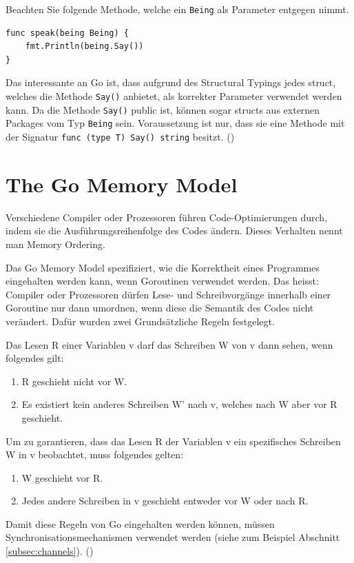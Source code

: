 \documentclass[11pt]{article}
\begin{document}
Beachten Sie folgende Methode, welche ein \lstinline{Being} als Parameter entgegen nimmt.
\begin{lstlisting}[caption=Verwenden eines Interfaces als Parameter]
func speak(being Being) {
	fmt.Println(being.Say())
}
\end{lstlisting}
Das interessante an Go ist, dass aufgrund des Structural Typings jedes struct, welches die Methode \lstinline{Say()} anbietet, als korrekter Parameter verwendet werden kann. Da die Methode \lstinline{Say()} public ist, können sogar structs aus externen Packages vom Typ \lstinline{Being} sein. Voraussetzung ist nur, dass sie eine Methode mit der Signatur \lstinline{func (type T) Say() string} besitzt. (\cite{Ducktypi27:online})


\section{The Go Memory Model}
Verschiedene Compiler oder Prozessoren führen Code-Optimierungen durch, indem sie die Ausführungsreihenfolge des Codes ändern. Dieses Verhalten nennt man Memory Ordering.

Das Go Memory Model spezifiziert, wie die Korrektheit eines Programmes eingehalten werden kann, wenn Goroutinen verwendet werden. Das heisst: Compiler oder Prozessoren dürfen Lese- und Schreibvorgänge innerhalb einer Goroutine nur dann umordnen, wenn diese die Semantik des Codes nicht verändert. Dafür wurden zwei Grundsätzliche Regeln festgelegt.

Das Lesen R einer Variablen v darf das Schreiben W von v dann sehen, wenn folgendes gilt:
 
\begin{enumerate}
    \item R geschieht nicht vor W.
    \item Es existiert kein anderes Schreiben W' nach v, welches nach W aber vor R geschieht.
\end{enumerate}

Um zu garantieren, dass das Lesen R der Variablen v ein spezifisches Schreiben W in v beobachtet, muss folgendes gelten:
\begin{enumerate}
    \item W geschieht vor R.
    \item Jedes andere Schreiben in v geschieht entweder vor W oder nach R.
\end{enumerate}

Damit diese Regeln von Go eingehalten werden können, müssen Synchronisationsmechanismen verwendet werden (siehe zum Beispiel Abschnitt \ref{subsec:channels}). (\cite{TheGoMem30:online})
\end{document}
